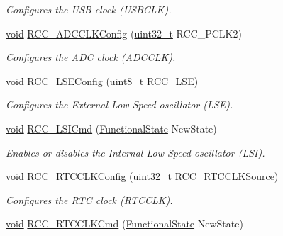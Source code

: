 \begin{DoxyCompactItemize}
\begin{DoxyCompactList}\small\item\em Configures the U\+SB clock (U\+S\+B\+C\+LK). \end{DoxyCompactList}\item 
\hyperlink{usb__devapi_8h_afabf60e7f57651d6d595a02c75f07cd0}{void} \hyperlink{group___r_c_c___exported___functions_gadda89cdb838bf49e5fa10f3f774530a4}{R\+C\+C\+\_\+\+A\+D\+C\+C\+L\+K\+Config} (\hyperlink{_p_e___types_8h_a33594304e786b158f3fb30289278f5af}{uint32\+\_\+t} R\+C\+C\+\_\+\+P\+C\+L\+K2)
\begin{DoxyCompactList}\small\item\em Configures the A\+DC clock (A\+D\+C\+C\+LK). \end{DoxyCompactList}\item 
\hyperlink{usb__devapi_8h_afabf60e7f57651d6d595a02c75f07cd0}{void} \hyperlink{group___r_c_c___exported___functions_ga65209ab5c3589b249c7d70f978735ca6}{R\+C\+C\+\_\+\+L\+S\+E\+Config} (\hyperlink{_p_e___types_8h_aba7bc1797add20fe3efdf37ced1182c5}{uint8\+\_\+t} R\+C\+C\+\_\+\+L\+SE)
\begin{DoxyCompactList}\small\item\em Configures the External Low Speed oscillator (L\+SE). \end{DoxyCompactList}\item 
\hyperlink{usb__devapi_8h_afabf60e7f57651d6d595a02c75f07cd0}{void} \hyperlink{group___r_c_c___exported___functions_ga81e3ca29fd154ac2019bba6936d6d5ed}{R\+C\+C\+\_\+\+L\+S\+I\+Cmd} (\hyperlink{agilefox_2library_2inc_2stm32f10x__type_8h_ac9a7e9a35d2513ec15c3b537aaa4fba1}{Functional\+State} New\+State)
\begin{DoxyCompactList}\small\item\em Enables or disables the Internal Low Speed oscillator (L\+SI). \end{DoxyCompactList}\item 
\hyperlink{usb__devapi_8h_afabf60e7f57651d6d595a02c75f07cd0}{void} \hyperlink{group___r_c_c___exported___functions_ga1473d8a5a020642966359611c44181b0}{R\+C\+C\+\_\+\+R\+T\+C\+C\+L\+K\+Config} (\hyperlink{_p_e___types_8h_a33594304e786b158f3fb30289278f5af}{uint32\+\_\+t} R\+C\+C\+\_\+\+R\+T\+C\+C\+L\+K\+Source)
\begin{DoxyCompactList}\small\item\em Configures the R\+TC clock (R\+T\+C\+C\+LK). \end{DoxyCompactList}\item 
\hyperlink{usb__devapi_8h_afabf60e7f57651d6d595a02c75f07cd0}{void} \hyperlink{group___r_c_c___exported___functions_ga9802f84846df2cea8e369234ed13b159}{R\+C\+C\+\_\+\+R\+T\+C\+C\+L\+K\+Cmd} (\hyperlink{agilefox_2library_2inc_2stm32f10x__type_8h_ac9a7e9a35d2513ec15c3b537aaa4fba1}{Functional\+State} New\+State)

\end{DoxyCompactItemize}
